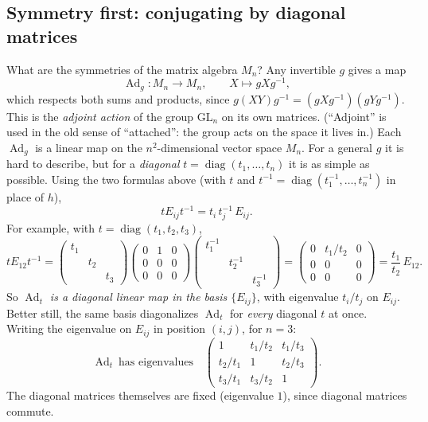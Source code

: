\documentclass[11pt,openany]{book}
\theoremstyle{plain}
\theoremstyle{definition}
\theoremstyle{remark}
\newcommand{\GL}{\mathrm{GL}}
\begin{document}
\subsection*{Symmetry first: conjugating by diagonal matrices}
What are the symmetries of the matrix algebra $M_n$? Any invertible $g$ gives a map
\[
  \operatorname{Ad}_g\colon M_n\to M_n,\qquad X\mapsto gXg^{-1},
\]
which respects both sums and products, since $g(XY)g^{-1}=(gXg^{-1})(gYg^{-1})$. This is the
\emph{adjoint action} of the group $\GL_n$ on its own matrices. (``Adjoint'' is used in the old sense
of ``attached'': the group acts on the space it lives in.) Each $\operatorname{Ad}_g$ is a linear map on
the $n^2$-dimensional vector space $M_n$. For a general $g$ it is hard to describe, but for a
\emph{diagonal} $t=\operatorname{diag}(t_1,\dots,t_n)$ it is as simple as possible. Using the two
formulas above (with $t$ and $t^{-1}=\operatorname{diag}(t_1^{-1},\dots,t_n^{-1})$ in place of $h$),
\[
  tE_{ij}t^{-1}=t_i\,t_j^{-1}\,E_{ij}.
\]
For example, with $t=\operatorname{diag}(t_1,t_2,t_3)$,
\[
  tE_{12}t^{-1}=
  \begin{pmatrix}t_1&&\\&t_2&\\&&t_3\end{pmatrix}
  \begin{pmatrix}0&1&0\\0&0&0\\0&0&0\end{pmatrix}
  \begin{pmatrix}t_1^{-1}&&\\&t_2^{-1}&\\&&t_3^{-1}\end{pmatrix}
  =\begin{pmatrix}0&t_1/t_2&0\\0&0&0\\0&0&0\end{pmatrix}=\frac{t_1}{t_2}\,E_{12}.
\]
So \emph{$\operatorname{Ad}_t$ is a diagonal linear map in the basis $\{E_{ij}\}$}, with eigenvalue
$t_i/t_j$ on $E_{ij}$. Better still, the same basis diagonalizes $\operatorname{Ad}_t$ for \emph{every}
diagonal $t$ at once. Writing the eigenvalue on $E_{ij}$ in position $(i,j)$, for $n=3$:
\[
  \operatorname{Ad}_t\ \text{has eigenvalues}\quad
  \begin{pmatrix}1&t_1/t_2&t_1/t_3\\ t_2/t_1&1&t_2/t_3\\ t_3/t_1&t_3/t_2&1\end{pmatrix}.
\]
The diagonal matrices themselves are fixed (eigenvalue $1$), since diagonal matrices commute.
\end{document}
